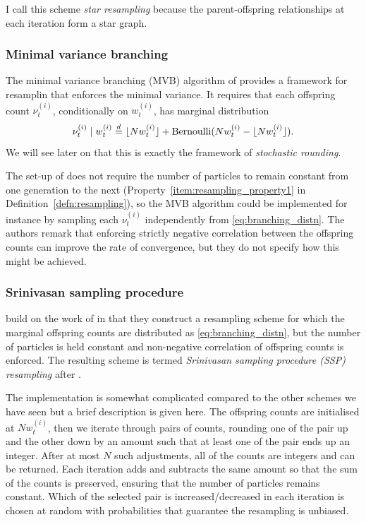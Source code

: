 I call this scheme \emph{star resampling} because the parent-offspring relationships at each iteration form a star graph.


\subsubsection{Minimal variance branching}
The minimal variance branching (MVB) algorithm of \textcite{crisan1999} provides a framework for resamplin that enforces the minimal variance. 
It requires that each offspring count $\nu_t^{(i)}$, conditionally on $w_t^{(i)}$, has marginal distribution
\begin{equation}\label{eq:branching_distn}
\nu_t^{(i)} \mid w_t^{(i)} \overset{d}{=} \lfloor N w_t^{(i)} \rfloor + \operatorname{Bernoulli}(Nw_t^{(i)} - \lfloor N w_t^{(i)} \rfloor) .
\end{equation}
We will see later on that this is exactly the framework of \emph{stochastic rounding}.

The set-up of \textcite{crisan1999} does not require the number of particles to remain constant from one generation to the next (Property~\ref{item:resampling_property1} in Definition~\ref{defn:resampling}), so the MVB algorithm could be implemented for instance by sampling each $\nu_t^{(i)}$ independently from \eqref{eq:branching_distn}. The authors remark that enforcing strictly negative correlation between the offspring counts can improve the rate of convergence, but they do not specify how this might be achieved.


\subsubsection{Srinivasan sampling procedure}
\textcite{gerber2017} build on the work of \textcite{crisan1999} in that they construct a resampling scheme for which the marginal offspring counts are distributed as \eqref{eq:branching_distn}, but the number of particles is held constant and non-negative correlation of offspring counts is enforced. The resulting scheme is termed \emph{Srinivasan sampling procedure (SSP) resampling} after \textcite{srinivasan2001}.

The implementation is somewhat complicated compared to the other schemes we have seen \parencite[for full details see][Algorithm~1]{gerber2017} but a brief description is given here.
The offspring counts are initialised at $Nw_t^{(i)}$, then we iterate through pairs of counts, rounding one of the pair up and the other down by an amount such that at least one of the pair ends up an integer. After at most $N$ such adjustments, all of the counts are integers and can be returned. Each iteration adds and subtracts the same amount so that the sum of the counts is preserved, ensuring that the number of particles remains constant. Which of the selected pair is increased/decreased in each iteration is chosen at random with probabilities that guarantee the resampling is unbiased.

